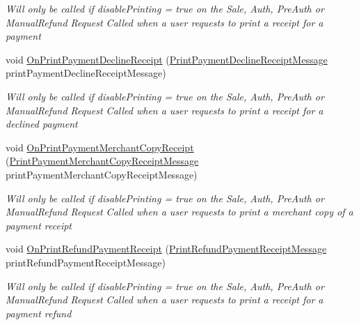 \begin{DoxyCompactItemize}
\begin{DoxyCompactList}\small\item\em Will only be called if disable\+Printing = true on the Sale, Auth, Pre\+Auth or Manual\+Refund Request Called when a user requests to print a receipt for a payment \end{DoxyCompactList}\item 
void \hyperlink{interfacecom_1_1clover_1_1remotepay_1_1sdk_1_1_i_clover_connector_listener_a3f1e0e6bd2b019c4e1ecbbb39078d0a7}{On\+Print\+Payment\+Decline\+Receipt} (\hyperlink{classcom_1_1clover_1_1remotepay_1_1sdk_1_1_print_payment_decline_receipt_message}{Print\+Payment\+Decline\+Receipt\+Message} print\+Payment\+Decline\+Receipt\+Message)
\begin{DoxyCompactList}\small\item\em Will only be called if disable\+Printing = true on the Sale, Auth, Pre\+Auth or Manual\+Refund Request Called when a user requests to print a receipt for a declined payment \end{DoxyCompactList}\item 
void \hyperlink{interfacecom_1_1clover_1_1remotepay_1_1sdk_1_1_i_clover_connector_listener_a487aca873c4e0bfa4222f9712f919efa}{On\+Print\+Payment\+Merchant\+Copy\+Receipt} (\hyperlink{classcom_1_1clover_1_1remotepay_1_1sdk_1_1_print_payment_merchant_copy_receipt_message}{Print\+Payment\+Merchant\+Copy\+Receipt\+Message} print\+Payment\+Merchant\+Copy\+Receipt\+Message)
\begin{DoxyCompactList}\small\item\em Will only be called if disable\+Printing = true on the Sale, Auth, Pre\+Auth or Manual\+Refund Request Called when a user requests to print a merchant copy of a payment receipt \end{DoxyCompactList}\item 
void \hyperlink{interfacecom_1_1clover_1_1remotepay_1_1sdk_1_1_i_clover_connector_listener_a728073276539065bc64d4eea1009394d}{On\+Print\+Refund\+Payment\+Receipt} (\hyperlink{classcom_1_1clover_1_1remotepay_1_1sdk_1_1_print_refund_payment_receipt_message}{Print\+Refund\+Payment\+Receipt\+Message} print\+Refund\+Payment\+Receipt\+Message)
\begin{DoxyCompactList}\small\item\em Will only be called if disable\+Printing = true on the Sale, Auth, Pre\+Auth or Manual\+Refund Request Called when a user requests to print a receipt for a payment refund \end{DoxyCompactList}\item 

\end{DoxyCompactItemize}
